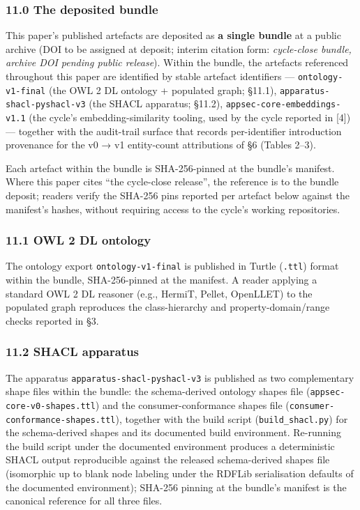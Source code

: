 \documentclass[
]{article}
\begin{document}
\subsubsection{11.0 The deposited bundle}\label{the-deposited-bundle}

This paper's published artefacts are deposited as \textbf{a single
bundle} at a public archive (DOI to be assigned at deposit; interim
citation form: \emph{cycle-close bundle, archive DOI pending public
release}). Within the bundle, the artefacts referenced throughout this
paper are identified by stable artefact identifiers ---
\texttt{ontology-v1-final} (the OWL 2 DL ontology + populated graph;
§11.1), \texttt{apparatus-shacl-pyshacl-v3} (the SHACL apparatus;
§11.2), \texttt{appsec-core-embeddings-v1.1} (the cycle's
embedding-similarity tooling, used by the cycle reported in {[}4{]}) ---
together with the audit-trail surface that records per-identifier
introduction provenance for the v0 → v1 entity-count attributions of §6
(Tables 2--3).

Each artefact within the bundle is SHA-256-pinned at the bundle's
manifest. Where this paper cites ``the cycle-close release'', the
reference is to the bundle deposit; readers verify the SHA-256 pins
reported per artefact below against the manifest's hashes, without
requiring access to the cycle's working repositories.

\subsubsection{11.1 OWL 2 DL ontology}\label{owl-2-dl-ontology}

The ontology export \texttt{ontology-v1-final} is published in Turtle
(\texttt{.ttl}) format within the bundle, SHA-256-pinned at the
manifest. A reader applying a standard OWL 2 DL reasoner (e.g., HermiT,
Pellet, OpenLLET) to the populated graph reproduces the class-hierarchy
and property-domain/range checks reported in §3.

\subsubsection{11.2 SHACL apparatus}\label{shacl-apparatus}

The apparatus \texttt{apparatus-shacl-pyshacl-v3} is published as two
complementary shape files within the bundle: the schema-derived ontology
shapes file (\texttt{appsec-core-v0-shapes.ttl}) and the
consumer-conformance shapes file
(\texttt{consumer-conformance-shapes.ttl}), together with the build
script (\texttt{build\_shacl.py}) for the schema-derived shapes and its
documented build environment. Re-running the build script under the
documented environment produces a deterministic SHACL output
reproducible against the released schema-derived shapes file (isomorphic
up to blank node labeling under the RDFLib serialisation defaults of the
documented environment); SHA-256 pinning at the bundle's manifest is the
canonical reference for all three files.
\end{document}
